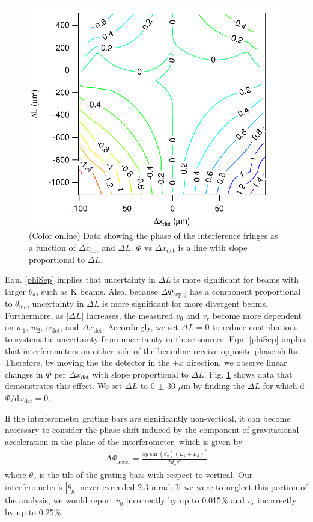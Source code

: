 \documentclass[twocolumn,prl,showpacs,superscriptaddress]{revtex4-1}   %
\newcommand{\figref}[1]{Fig. \ref{#1}}
\newcommand{\eqnref}[1]{Eqn. \eqref{#1}}
\newcommand{\dphisepj}{\Delta\Phi_{\mathrm{sep},j}}
\newcommand{\dphiaccel}{\Delta\Phi_{\mathrm{accel}}}
\begin{document}
\begin{figure}
\includegraphics[width=\linewidth,keepaspectratio]{phaseVsdxDetdL_141202.pdf}
\caption{\label{PhaseVsThings}(Color online)
Data showing the phase of the interference fringes as a function of $\Delta x_{\mathrm{det}}$ and $\Delta L$. $\Phi$ vs $\Delta x_{\mathrm{det}}$ is a line with slope proportional to $\Delta L$. 
}
\end{figure}

\eqnref{phiSep} implies that uncertainty in $\Delta L$ is more significant for beams with larger $\theta_d$, such as K beams.
Also, because $\dphisepj$ has a component proportional to $\theta_{\mathrm{inc}}$, uncertainty in $\Delta L$ is more significant for more divergent beams.
Furthermore, as $|\Delta L|$ increases, the measured $v_0$ and $v_r$ become more dependent on $w_1$, $w_2$, $w_{\mathrm{det}}$, and $\Delta x_{\mathrm{det}}$. Accordingly, we set $\Delta L = 0$ to reduce contributions to systematic uncertainty from uncertainty in those sources. 
\eqnref{phiSep} implies that interferometers on either side of the beamline receive opposite phase shifts. 
Therefore, by moving the the detector in the $\pm x$ direction, we  observe linear changes in $\Phi$ per $\Delta x_{\mathrm{det}}$ with slope proportional to $\Delta L$.
\figref{PhaseVsThings} shows data that demonstrates this effect.
We set $\Delta L$ to 0 $\pm$ 30 $\mu$m by finding the $\Delta L$ for which d$\Phi/$d$x_{\mathrm{det}} = 0$.

If the interferometer grating bars are significantly non-vertical, it can become necessary to consider the phase shift induced by the component of gravitational acceleration in the plane of the interferometer, which is given by
\begin{align}
	\dphiaccel = \frac{\pi g\sin({\theta_g})(L_1+L_2)^2}{2d_g v^2}
	\label{phiAccel}
\end{align}
where $\theta_g$ is the tilt of the grating bars with respect to vertical. 
Our interferometer's $|\theta_g|$ never exceeded 2.3 mrad. If we were to neglect this portion of the analysis, we would report $v_0$ incorrectly by up to 0.015\% and $v_r$ incorrectly by up to 0.25\%.
\end{document}

